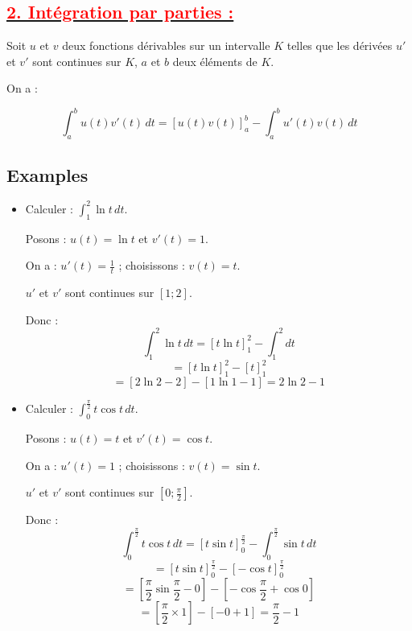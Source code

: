 \documentclass[12pt,a4paper]{article}
\begin{document}
\subsection*{\underline{\textbf{\textcolor{red}{2. Intégration par parties : }}}}
Soit \( u \) et \( v \) deux fonctions dérivables sur un intervalle \( K \) telles que les dérivées \( u' \) et \( v' \) sont continues sur \( K \), \( a \) et \( b \) deux éléments de \( K \).

On a :

\[
\int_a^b u(t) v'(t) \, dt = \left[ u(t) v(t) \right]_a^b - \int_a^b u'(t) v(t) \, dt
\]

\subsection*{Examples}

\begin{itemize}
    \item Calculer : \( \int_1^2 \ln t \, dt \).
    
    Posons : \( u(t) = \ln t \) et \( v'(t) = 1 \).
    
    On a : \( u'(t) = \frac{1}{t} \) ; choisissons : \( v(t) = t \).
    
    \( u' \) et \( v' \) sont continues sur \( [1 ; 2] \).
    
    Donc :
    \[
    \int_1^2 \ln t \, dt = \left[ t \ln t \right]_1^2 - \int_1^2 dt
    \]
    \[
    = \left[ t \ln t \right]_1^2 - \left[ t \right]_1^2
    \]
    \[
    = \left[ 2 \ln 2 - 2 \right] - \left[ 1 \ln 1 - 1 \right] = 2 \ln 2 - 1
    \]
    
    \item Calculer : \( \int_0^{\frac{\pi}{2}} t \cos t \, dt \).
    
    Posons : \( u(t) = t \) et \( v'(t) = \cos t \).
    
    On a : \( u'(t) = 1 \) ; choisissons : \( v(t) = \sin t \).
    
    \( u' \) et \( v' \) sont continues sur \( [0 ; \frac{\pi}{2}] \).
    
    Donc :
    \[
    \int_0^{\frac{\pi}{2}} t \cos t \, dt = \left[ t \sin t \right]_0^{\frac{\pi}{2}} - \int_0^{\frac{\pi}{2}} \sin t \, dt
    \]
    \[
    = \left[ t \sin t \right]_0^{\frac{\pi}{2}} - \left[ - \cos t \right]_0^{\frac{\pi}{2}}
    \]
    \[
    = \left[ \frac{\pi}{2} \sin \frac{\pi}{2} - 0 \right] - \left[ - \cos \frac{\pi}{2} + \cos 0 \right]
    \]
    \[
    = \left[ \frac{\pi}{2} \times 1 \right] - \left[ - 0 + 1 \right] = \frac{\pi}{2} - 1
    \]
\end{itemize}
\end{document}
